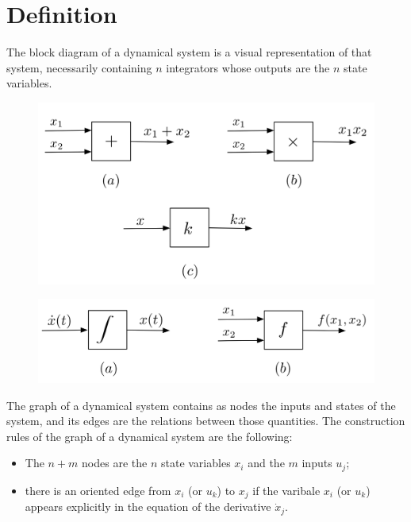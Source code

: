 \documentclass[12pt, openany]{report}
\theoremstyle{definition}
\begin{document}
\section{Definition}
The block diagram of a dynamical system is a visual representation of that system, necessarily containing \(n\) integrators whose outputs are the \(n\) state variables. \\
\begin{minipage}{.5\textwidth}
    \begin{figure}[H]
        \centering
        \includegraphics[width = \textwidth]{img/block_1.png}
    \end{figure}
\end{minipage}
\begin{minipage}{.5\textwidth}
    \begin{figure}[H]
        \centering
        \includegraphics[width = \textwidth]{img/block_2.png}
    \end{figure}
\end{minipage}
The graph of a dynamical system contains as nodes the inputs and states of the system, and its edges are the relations between those quantities. The construction rules of the graph of a dynamical system are the following:
\begin{itemize}
    \item The \(n+m\) nodes are the \(n\) state variables \(x_i\) and the \(m\) inputs \(u_j\);
    \item there is an oriented edge from \(x_i\) (or \(u_k\)) to \(x_j\) if the varibale \(x_i\) (or \(u_k\)) appears explicitly in the equation of the derivative \(\dot x_j\).
\end{itemize}
\end{document}
